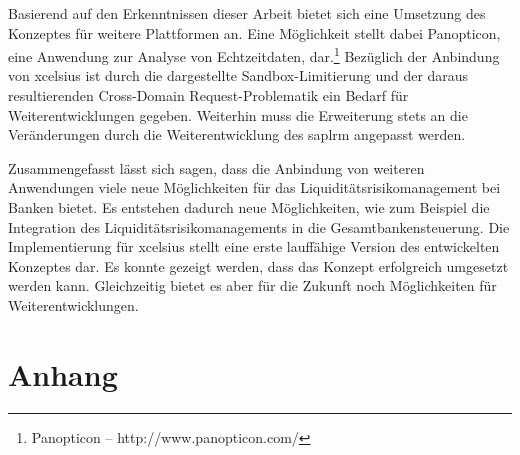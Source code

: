 \begin{onehalfspacing}
Basierend auf den Erkenntnissen dieser Arbeit bietet sich eine Umsetzung des Konzeptes für weitere Plattformen an. Eine Möglichkeit stellt dabei Panopticon, eine Anwendung zur Analyse von Echtzeitdaten, dar.\footnote{Panopticon -- http://www.panopticon.com/} Bezüglich der Anbindung von \gls{xcelsius} ist durch die dargestellte Sandbox-Limitierung und der daraus resultierenden Cross-Domain Request-Problematik ein Bedarf für Weiterentwicklungen gegeben. Weiterhin muss die Erweiterung stets an die Veränderungen durch die Weiterentwicklung des \gls{saplrm} angepasst werden.

Zusammengefasst lässt sich sagen, dass die Anbindung von weiteren Anwendungen viele neue Möglichkeiten für das Liquiditätsrisikomanagement bei Banken bietet. Es entstehen dadurch neue Möglichkeiten, wie zum Beispiel die Integration des Liquiditätsrisikomanagements in die Gesamtbankensteuerung. Die Implementierung für \gls{xcelsius} stellt eine erste lauffähige Version des entwickelten Konzeptes dar. Es konnte gezeigt werden, dass das Konzept erfolgreich umgesetzt werden kann. Gleichzeitig bietet es aber für die Zukunft noch Möglichkeiten für Weiterentwicklungen.

\end{onehalfspacing}


\seAppendix{}

\setcounter{page}{8}


\chapter{Anhang}

